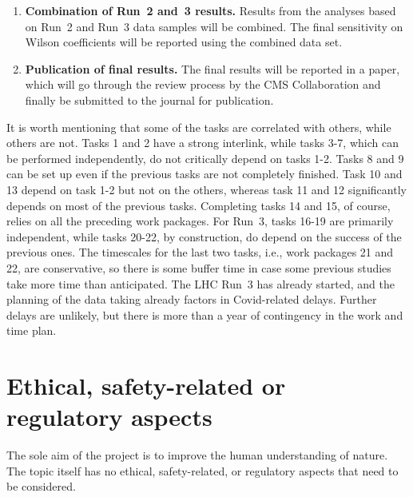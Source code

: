 \documentclass[a4paper,11pt]{article}
\begin{document}
\begin{enumerate}[noitemsep,topsep=0pt]
\item {\bf Combination of Run~2 and~3 results.} Results from the analyses based on Run~2 and Run~3 data samples will be combined. The final sensitivity on Wilson coefficients will be reported using the combined data set. 

\item {\bf Publication of final results.} The final results will be reported in a paper, which will go through the review process by the CMS Collaboration and finally be submitted to the journal for publication. 

\end{enumerate}

It is worth mentioning that some of the tasks are correlated with others, while others are not. 
Tasks 1 and 2 have a strong interlink, while tasks 3-7, which can be performed independently, do not critically depend on tasks 1-2. 
Tasks 8 and 9 can be set up even if the previous tasks are not completely finished.
Task 10 and 13 depend on task 1-2 but not on the others, whereas task 11 and 12 significantly depends on most of the previous tasks.
Completing tasks 14 and 15, of course, relies on all the preceding work packages. 
For Run~3, tasks 16-19 are primarily independent, while tasks 20-22, by construction, do depend on the success of the previous ones.
The timescales for the last two tasks, i.e., work packages 21 and 22, are conservative, so there is some buffer time in case some previous studies take more time than anticipated.
The LHC Run~3 has already started, and the planning of the data taking already factors in Covid-related delays. Further delays are unlikely, but there is more than a year of contingency in the work and time plan.


\section{Ethical, safety-related or regulatory aspects}

The sole aim of the project is to improve the human understanding of nature. 
The topic itself has no ethical, safety-related, or regulatory aspects that need to be considered.
\end{document}

